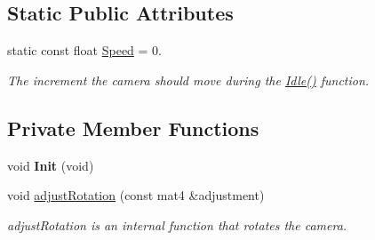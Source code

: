 \subsection*{\-Static \-Public \-Attributes}
\begin{DoxyCompactItemize}
\item 
static const float \hyperlink{class_camera_aedf8ba8b2af631a5a3e33b19bfa40322}{\-Speed} = 0.
\begin{DoxyCompactList}\small\item\em \-The increment the camera should move during the \hyperlink{class_camera_aec3559fe43597656629fdb00157d3c73}{\-Idle()} function. \end{DoxyCompactList}\end{DoxyCompactItemize}
\subsection*{\-Private \-Member \-Functions}
\begin{DoxyCompactItemize}
\item 
\hypertarget{class_camera_a394e2a2b71bfe325ee82e14a1bfea1f1}{void {\bfseries \-Init} (void)}\label{class_camera_a394e2a2b71bfe325ee82e14a1bfea1f1}

\item 
void \hyperlink{class_camera_a7ffc3619f9a5d8e586cb3d96ebdd3188}{adjust\-Rotation} (const mat4 \&adjustment)
\begin{DoxyCompactList}\small\item\em adjust\-Rotation is an internal function that rotates the camera. \end{DoxyCompactList}\end{DoxyCompactItemize}
